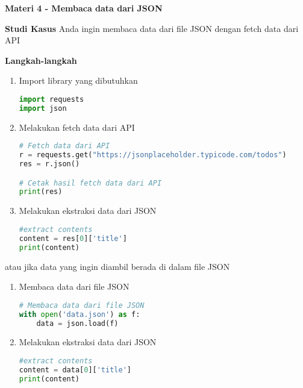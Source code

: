 \documentclass{article}
\begin{document}
    \begin{flushleft}
        \textbf{Materi 4 \@- Membaca data dari JSON}
        \newline

        \textbf{Studi Kasus}
        \newline
        Anda ingin membaca data dari file JSON dengan fetch data dari API
        \newline

        \textbf{Langkah-langkah}

        \begin{enumerate}
            \item Import library yang dibutuhkan
            \lstset{style=pythonstyle}
            \begin{lstlisting}[language=python]
import requests
import json
            \end{lstlisting}

            \item Melakukan fetch data dari API
            \lstset{style=pythonstyle}
            \begin{lstlisting}[language=python]
# Fetch data dari API
r = requests.get("https://jsonplaceholder.typicode.com/todos")
res = r.json()

# Cetak hasil fetch data dari API
print(res)
            \end{lstlisting}

            \item Melakukan ekstraksi data dari JSON
            \lstset{style=pythonstyle}
            \begin{lstlisting}[language=python]
#extract contents
content = res[0]['title']
print(content)
            \end{lstlisting}
        \end{enumerate}

        atau jika data yang ingin diambil berada di dalam file JSON

        \begin{enumerate}
            \item Membaca data dari file JSON
            \lstset{style=pythonstyle}
            \begin{lstlisting}[language=python]
# Membaca data dari file JSON
with open('data.json') as f:
    data = json.load(f)
            \end{lstlisting}

            \item Melakukan ekstraksi data dari JSON
            \lstset{style=pythonstyle}
            \begin{lstlisting}[language=python]
#extract contents
content = data[0]['title']
print(content)
            \end{lstlisting}
        \end{enumerate}
    \end{flushleft}
\end{document}
